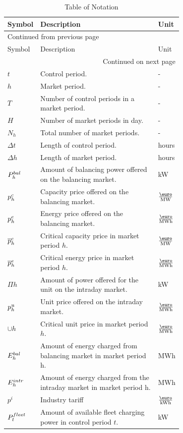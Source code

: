 \documentclass[a4paper, 12pt]{article}
\begin{document}
\begin{longtable}{l|p{0.7\linewidth}|l}
\caption[Table of Notation]{Table of Notation \label{table-notation}}
\\
\hline
\hline
Symbol & Description & Unit\\
\hline
\endfirsthead
\multicolumn{3}{l}{Continued from previous page} \\
\hline

Symbol & Description & Unit \\

\hline
\endhead
\hline\multicolumn{3}{r}{Continued on next page} \\
\endfoot
\endlastfoot
\hline
\(t\) & Control period. & -\\
\(h\) & Market period. & -\\
\(T\) & Number of control periods in a market period. & -\\
\(H\) & Number of market periods in day. & -\\
\(N_h\) & Total number of market periods. & -\\
\(\Delta t\) & Length of control period. & hours\\
\(\Delta h\) & Length of market period. & hours\\
\hline
\(P^{bal}_{h}\) & Amount of balancing power offered on the balancing market. & kW\\
\(p^c_{h}\) & Capacity price offered on the balancing market. & \(\emw\)\\
\(p^e_{h}\) & Energy price offered on the balancing market. & \(\emwh\)\\
\(\overline p^c_{h}\) & Critical capacity price in market period \(h\). & \(\emw\)\\
\(\overline p^e_{h}\) & Critical energy price in market period \(h\). & \(\emwh\)\\
\hline
\(\Pi{h}\) & Amount of power offered for the unit on the intraday market. & kW\\
\(p^u_{h}\) & Unit price offered on the intraday market. & \(\emwh\)\\
\(\cup{h}\) & Critical unit price in market period \(h\). & \(\emwh\)\\
\hline
\(E^{bal}_{h}\) & Amount of energy charged from balancing market in market period h. & MWh\\
\(E^{intr}_{h}\) & Amount of energy charged from the intraday market in market period h. & MWh\\
\(p^{i}\) & Industry tariff & \(\ekwh\)\\
\hline
\(P^{fleet}_{t}\) & Amount of available fleet charging power in control period \(t\). & kW\\

\end{longtable}
\end{document}
